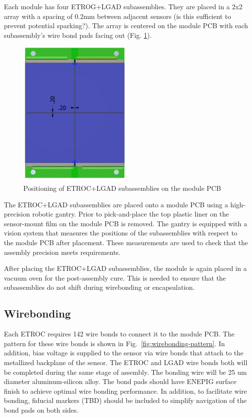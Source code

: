 \documentclass[10pt]{datasheet}
\begin{document}
Each module has four ETROG+LGAD subassemblies. They are placed in a 2x2 array with a spacing of 0.2mm between adjacent sensors (is this sufficient to prevent potential sparking?). The array is centered on the module PCB with each subassembly's wire bond pads facing out (Fig. \ref{fig:mod-with-bbms}).

\begin{figure}[h]
	\centering
	\includegraphics[width=0.5\textwidth,angle=90]{figures/module-with-bbms.png}
	\caption{Positioning of ETROC+LGAD subassemblies on the module PCB}
	\label{fig:mod-with-bbms}	
\end{figure}

The ETROC+LGAD subassemblies are placed onto a module PCB using a high-precision robotic gantry. Prior to pick-and-place the top plastic liner on the sensor-mount film on the module PCB is removed. The gantry is equipped with a vision system that measures the positions of the subassemblies with respect to the module PCB after placement. These measurements are used to check that the assembly precision meets requirements.

After placing the ETROC+LGAD subassemblies, the module is again placed in a vacuum oven for the post-assembly cure. This is needed to ensure that the subassemblies do not shift during wirebonding or encapsulation.


\subsection{Wirebonding}

Each ETROC requires 142 wire bonds to connect it to the module PCB. The pattern for these wire bonds is shown in Fig.~\ref{fig:wirebonding-pattern}. In addition, bias voltage is supplied to the sensor via wire bonds that attach to the metallized backplane of the sensor. The ETROC and LGAD wire bonds both will be completed during the same stage of assembly. The bonding wire will be 25 um diameter aluminum-silicon alloy. The bond pads should have ENEPIG surface finish to achieve optimal wire bonding performance.  In addition, to facilitate wire bonding, fiducial markers (TBD) should be included to simplify navigation of the bond pads on both sides.
\end{document}
